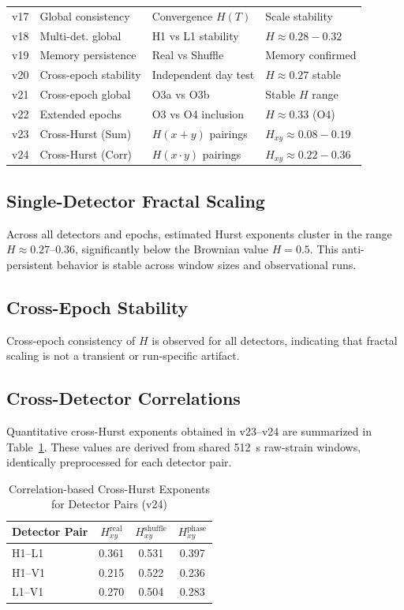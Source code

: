 \documentclass[11pt,a4paper]{article}
\begin{document}
\begin{longtable}{p{1.3cm}p{4.8cm}p{4.5cm}p{3.4cm}}
v17 & Global consistency & Convergence $H(T)$ & Scale stability \\
v18 & Multi-det. global & H1 vs L1 stability & $H \approx 0.28-0.32$ \\
v19 & Memory persistence & Real vs Shuffle & Memory confirmed \\
v20 & Cross-epoch stability & Independent day test & $H \approx 0.27$ stable \\
v21 & Cross-epoch global & O3a vs O3b & Stable $H$ range \\
v22 & Extended epochs & O3 vs O4 inclusion & $H \approx 0.33$ (O4) \\
v23 & Cross-Hurst (Sum) & $H(x+y)$ pairings & $H_{xy} \approx 0.08-0.19$ \\
v24 & Cross-Hurst (Corr) & $H(x \cdot y)$ pairings & $H_{xy} \approx 0.22-0.36$ \\
\bottomrule
\end{longtable}



\subsection{Single-Detector Fractal Scaling}
Across all detectors and epochs, estimated Hurst exponents cluster in the range $H\approx0.27$--$0.36$, significantly below the Brownian value $H=0.5$. This anti-persistent behavior is stable across window sizes and observational runs.

\subsection{Cross-Epoch Stability}
Cross-epoch consistency of $H$ is observed for all detectors, indicating that fractal scaling is not a transient or run-specific artifact.

\subsection{Cross-Detector Correlations}
Quantitative cross-Hurst exponents obtained in v23--v24 are summarized in Table~\ref{tab:cross_hurst_numbers}. These values are derived from shared 512~s raw-strain windows, identically preprocessed for each detector pair.

\begin{table}[H]
\centering
\caption{Correlation-based Cross-Hurst Exponents for Detector Pairs (v24)}
\label{tab:cross_hurst_numbers}
\begin{tabular}{lccc}
\toprule
Detector Pair & $H_{xy}^{\mathrm{real}}$ & $H_{xy}^{\mathrm{shuffle}}$ & $H_{xy}^{\mathrm{phase}}$ \\
\midrule
H1--L1 & 0.361 & 0.531 & 0.397 \\
H1--V1 & 0.215 & 0.522 & 0.236 \\
L1--V1 & 0.270 & 0.504 & 0.283 \\
\bottomrule
\end{tabular}
\end{table}
\end{document}
